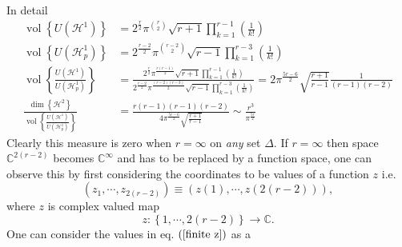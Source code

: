 \documentclass[aps,preprint]{revtex4}%
\begin{document}
In detail
\begin{align}
\operatorname*{vol}\left\{  U\left(  \mathcal{H}^{1}\right)  \right\}   &
=2^{\frac{r}{2}}\pi^{\binom{r}{2}}\sqrt{r+1}%
{\displaystyle\prod\limits_{k=1}^{r-1}}
\left(  \frac{1}{k!}\right) \\
\operatorname*{vol}\left\{  U\left(  \mathcal{H}_{p}^{1}\right)  \right\}   &
=2^{\frac{r-2}{2}}\pi^{\binom{r-2}{2}}\sqrt{r-1}%
{\displaystyle\prod\limits_{k=1}^{r-3}}
\left(  \frac{1}{k!}\right) \\
\operatorname*{vol}\left\{  \frac{U\left(  \mathcal{H}^{1}\right)  }{U\left(
\mathcal{H}_{p}^{1}\right)  }\right\}   &  =\frac{2^{\frac{r}{2}}\pi
^{\frac{r\left(  r-1\right)  }{2}}\sqrt{r+1}%
{\displaystyle\prod\limits_{k=1}^{r-1}}
\left(  \frac{1}{k!}\right)  }{2^{\frac{r-2}{2}}\pi^{\frac{\left(  r-2\right)
\left(  r-3\right)  }{2}}\sqrt{r-1}%
{\displaystyle\prod\limits_{k=1}^{r-3}}
\left(  \frac{1}{k!}\right)  }=2\pi^{\frac{5r-6}{2}}\sqrt{\frac{r+1}{r-1}%
}\frac{1}{\left(  r-1\right)  \left(  r-2\right)  }\\
\frac{\dim\left\{  \mathcal{H}^{2}\right\}  }{\operatorname*{vol}\left\{
\frac{U\left(  \mathcal{H}^{1}\right)  }{U\left(  \mathcal{H}_{p}^{1}\right)
}\right\}  }  &  =\frac{r\left(  r-1\right)  \left(  r-1\right)  \left(
r-2\right)  }{4\pi^{\frac{5r-6}{2}}\sqrt{\frac{r+1}{r-1}}}\sim\frac{r^{3}}%
{\pi^{\frac{5r}{2}}}%
\end{align}
Clearly this measure is zero when $r=\infty$ on \emph{any }set $\Delta.$ If
$r=\infty$ then space $\mathbb{C}^{2\left(  r-2\right)  }$ becomes
$\mathbb{C}^{\infty}$ and has to be replaced by a function space, one can
observe this by first considering the coordinates to be values of a function
$z$ i.e.
\begin{equation}
\left(  z_{1},\cdots,z_{2\left(  r-2\right)  }\right)  \equiv\left(  z\left(
1\right)  ,\cdots,z\left(  2\left(  r-2\right)  \right)  \right)  ,
\end{equation}
where $z$ is complex valued map
\begin{equation}
z:\left\{  1,\cdots,2\left(  r-2\right)  \right\}  \rightarrow\mathbb{C}.
\label{finite z}%
\end{equation}
One can consider the values in eq. $\left(  \ref{finite z}\right)  $ as a
\end{document}
